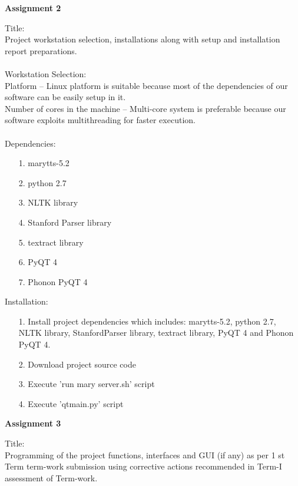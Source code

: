 \documentclass[oneside,a4paper,12pt]{book}
\begin{document}
\begin{appendices}
\newpage
\begin{center}
	\textbf{Assignment 2}
\end{center}
Title:\\
Project workstation selection, installations along with setup and installation report preparations.\\\\
Workstation Selection:\\
Platform – Linux platform is suitable because most of the dependencies of our software can be easily setup in it.\\
Number of cores in the machine – Multi-core system is preferable because our software exploits multithreading for faster execution.\\\\
Dependencies:
\begin{enumerate}
	\item[1.] marytts-5.2
	\item[2.] python 2.7
	\item[3.] NLTK library
	\item[4.] Stanford Parser library
	\item[5.] textract library
	\item[6.] PyQT 4
	\item[7.] Phonon PyQT 4
\end{enumerate}
Installation:
\begin{enumerate}
	\item[1.] Install project dependencies which includes: marytts-5.2, python 2.7,
	NLTK library, StanfordParser library, textract library, PyQT 4 and
	Phonon PyQT 4.
	\item[2.] Download project source code
	\item[3.] Execute 'run mary server.sh' script
	\item[4.] Execute 'qtmain.py' script
\end{enumerate}

\newpage
\begin{center}
	\textbf{Assignment 3}
\end{center}
Title:\\
 Programming of the project functions, interfaces and GUI (if any) as per 1 st Term term-work submission using corrective actions recommended in Term-I assessment of Term-work. \\ \\
 

\end{appendices}
\end{document}
